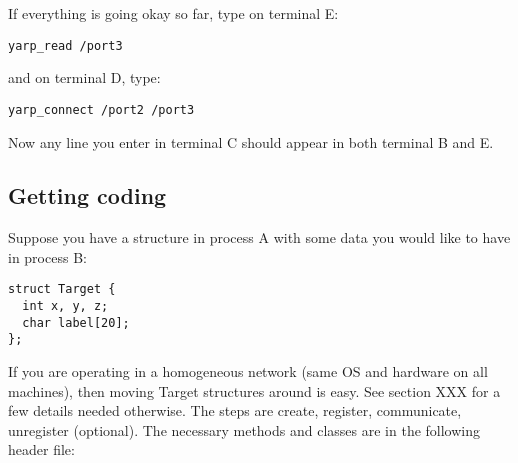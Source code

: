 If everything is going okay so far, type on terminal E:
%
\begin{verbatim}
yarp_read /port3
\end{verbatim}
%
and on terminal D, type:
%
\begin{verbatim}
yarp_connect /port2 /port3
\end{verbatim}
%
Now any line you enter in terminal C should appear in both terminal B and E.



\subsection{Getting coding}

Suppose you have a structure  in process A with some data
you would like to have in process B:
%
\begin{verbatim}
struct Target {
  int x, y, z;
  char label[20];
};
\end{verbatim}
%
If you are operating in a homogeneous network (same OS and hardware on
all machines), then moving Target structures around is easy.  See
section XXX for a few details needed otherwise.
%
The steps are create, register, communicate, unregister (optional).
The necessary methods and classes are in the following header file:

